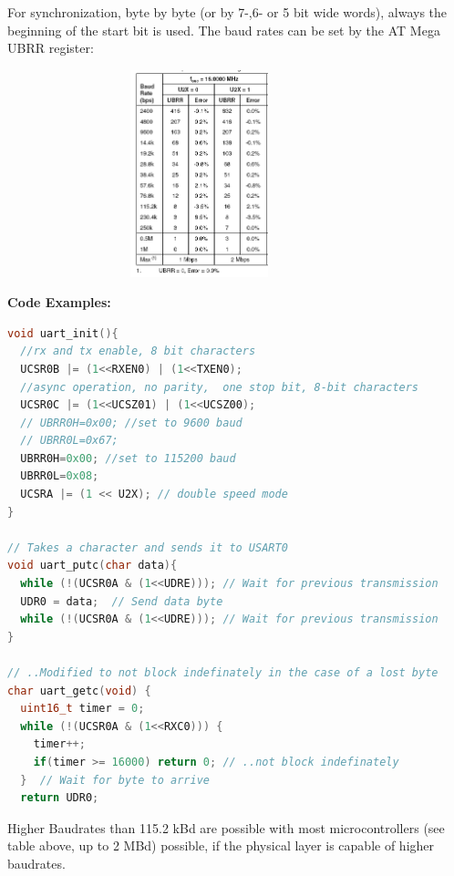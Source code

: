 For synchronization, byte by byte (or by 7-,6- or 5 bit wide words), always the beginning of the start bit is used. The baud rates can be set by the AT Mega UBRR register:

    \begin{figure}[h]
    \centering
    \includegraphics[width=9cm, height=6cm]{Images/image47.png}
    \label{fig:Fig }
    \end{figure}

\textbf{Code Examples:}\\

\begin{lstlisting}[style=mystyle, language=c]
void uart_init(){
  //rx and tx enable, 8 bit characters
  UCSR0B |= (1<<RXEN0) | (1<<TXEN0);
  //async operation, no parity,  one stop bit, 8-bit characters
  UCSR0C |= (1<<UCSZ01) | (1<<UCSZ00);
  // UBRR0H=0x00; //set to 9600 baud
  // UBRR0L=0x67;
  UBRR0H=0x00; //set to 115200 baud
  UBRR0L=0x08;
  UCSRA |= (1 << U2X); // double speed mode
}

// Takes a character and sends it to USART0
void uart_putc(char data){
  while (!(UCSR0A & (1<<UDRE))); // Wait for previous transmission
  UDR0 = data;  // Send data byte
  while (!(UCSR0A & (1<<UDRE))); // Wait for previous transmission
}

// ..Modified to not block indefinately in the case of a lost byte
char uart_getc(void) {
  uint16_t timer = 0;
  while (!(UCSR0A & (1<<RXC0))) {
    timer++;
    if(timer >= 16000) return 0; // ..not block indefinately
  }  // Wait for byte to arrive
  return UDR0;

\end{lstlisting}

Higher Baudrates than 115.2 kBd are possible with most microcontrollers (see table above, up to 2 MBd) possible, if the physical layer is capable of higher baudrates. \\

